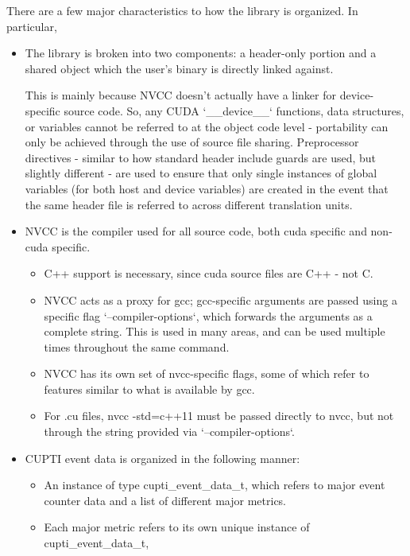 \documentclass[8pt, a4paper, twoside, twoclumn, english]{extreport}
\begin{document}
\begin {flushleft}
  There are a few major characteristics to how the library is organized. In particular,
  \begin {itemize}
  \item The library is broken into two components: a header-only portion and a shared object
    which the user's binary is directly linked against.
    \begin{flushleft}
      This is mainly because NVCC doesn't actually have a linker for device-specific source code.      
      So, any CUDA `\_\_device\_\_` functions, data structures, or variables cannot be referred to
      at the object code level - portability can only be achieved through the use of source file
      sharing.
      Preprocessor directives - similar to how standard header include guards are used, but slightly different -
      are used to ensure that only single instances of global variables (for both host and device variables) are created
      in the event that the same header file is referred to across different translation units.
    \end{flushleft}
  \item NVCC is the compiler used for all source code, both cuda specific and non-cuda specific.
    \begin {itemize}
    \item C++ support is necessary, since cuda source files are C++ - not C.
    \item NVCC acts as a proxy for gcc; gcc-specific arguments are passed using a specific
      flag `--compiler-options`,  which forwards the arguments as a complete string.
      This is used in many areas, and can be used multiple times throughout the same command.
    \item NVCC has its own set of nvcc-specific flags, some of which refer to features
      similar to what is available by gcc.
    \item For .cu files, nvcc -std=c++11 must be passed directly to nvcc,
      but not through the string provided via `--compiler-options`.
    \end{itemize}
  \item CUPTI event data is organized in the following manner:
    \begin {itemize}
    \item An instance of type cupti\_event\_data\_t, which refers to major event
      counter data and a list of different major metrics.
    \item Each major metric refers to its own unique instance of cupti\_event\_data\_t,

\end{itemize}
\end{itemize}
\end{flushleft}
\end{document}
